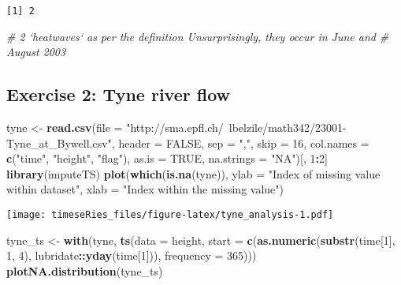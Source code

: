 \documentclass[]{book}
\newenvironment{Shaded}{\begin{snugshade}}{\end{snugshade}}
\newcommand{\CommentTok}[1]{\textcolor[rgb]{0.56,0.35,0.01}{\textit{#1}}}
\newcommand{\DataTypeTok}[1]{\textcolor[rgb]{0.13,0.29,0.53}{#1}}
\newcommand{\DecValTok}[1]{\textcolor[rgb]{0.00,0.00,0.81}{#1}}
\newcommand{\KeywordTok}[1]{\textcolor[rgb]{0.13,0.29,0.53}{\textbf{#1}}}
\newcommand{\NormalTok}[1]{#1}
\newcommand{\OperatorTok}[1]{\textcolor[rgb]{0.81,0.36,0.00}{\textbf{#1}}}
\newcommand{\OtherTok}[1]{\textcolor[rgb]{0.56,0.35,0.01}{#1}}
\newcommand{\StringTok}[1]{\textcolor[rgb]{0.31,0.60,0.02}{#1}}
\begin{document}
\begin{verbatim}
[1] 2
\end{verbatim}

\begin{Shaded}
\begin{Highlighting}[]
\CommentTok{# 2 `heatwaves` as per the definition Unsurprisingly, they occur in June and}
\CommentTok{# August 2003}
\end{Highlighting}
\end{Shaded}

\hypertarget{exercise-2-tyne-river-flow-1}{%
\subsection{Exercise 2: Tyne river
flow}\label{exercise-2-tyne-river-flow-1}}

\begin{Shaded}
\begin{Highlighting}[]
\NormalTok{tyne <-}\StringTok{ }\KeywordTok{read.csv}\NormalTok{(}\DataTypeTok{file =} \StringTok{"http://sma.epfl.ch/~lbelzile/math342/23001-Tyne_at_Bywell.csv"}\NormalTok{, }
    \DataTypeTok{header =} \OtherTok{FALSE}\NormalTok{, }\DataTypeTok{sep =} \StringTok{","}\NormalTok{, }\DataTypeTok{skip =} \DecValTok{16}\NormalTok{, }\DataTypeTok{col.names =} \KeywordTok{c}\NormalTok{(}\StringTok{"time"}\NormalTok{, }\StringTok{"height"}\NormalTok{, }\StringTok{"flag"}\NormalTok{), }
    \DataTypeTok{as.is =} \OtherTok{TRUE}\NormalTok{, }\DataTypeTok{na.strings =} \StringTok{"NA"}\NormalTok{)[, }\DecValTok{1}\OperatorTok{:}\DecValTok{2}\NormalTok{]}
\KeywordTok{library}\NormalTok{(imputeTS)}
\KeywordTok{plot}\NormalTok{(}\KeywordTok{which}\NormalTok{(}\KeywordTok{is.na}\NormalTok{(tyne)), }\DataTypeTok{ylab =} \StringTok{"Index of missing value within dataset"}\NormalTok{, }\DataTypeTok{xlab =} \StringTok{"Index within the missing value"}\NormalTok{)}
\end{Highlighting}
\end{Shaded}

\texttt{[image: timeseRies\_files/figure-latex/tyne\_analysis-1.pdf]}

\begin{Shaded}
\begin{Highlighting}[]
\NormalTok{tyne_ts <-}\StringTok{ }\KeywordTok{with}\NormalTok{(tyne, }\KeywordTok{ts}\NormalTok{(}\DataTypeTok{data =}\NormalTok{ height, }\DataTypeTok{start =} \KeywordTok{c}\NormalTok{(}\KeywordTok{as.numeric}\NormalTok{(}\KeywordTok{substr}\NormalTok{(time[}\DecValTok{1}\NormalTok{], }
    \DecValTok{1}\NormalTok{, }\DecValTok{4}\NormalTok{), lubridate}\OperatorTok{::}\KeywordTok{yday}\NormalTok{(time[}\DecValTok{1}\NormalTok{])), }\DataTypeTok{frequency =} \DecValTok{365}\NormalTok{)))}
\KeywordTok{plotNA.distribution}\NormalTok{(tyne_ts)}
\end{Highlighting}
\end{Shaded}
\end{document}

